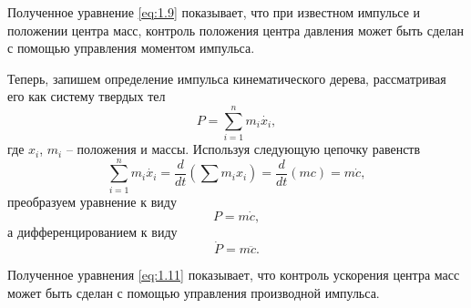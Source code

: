 Полученное уравнение \ref{eq:1.9} показывает, что при известном импульсе и положении центра масс, контроль положения центра давления может быть сделан с помощью управления моментом импульса.

Теперь, запишем определение импульса кинематического дерева, рассматривая его как систему твердых тел
\begin{equation*}
  P = \sum_{i = 1}^{n} m_{i} \dot{x_{i}},
\end{equation*}
где $x_{i}$, $m_{i}$ -- положения и массы. Используя следующую цепочку равенств
\begin{equation*}
  \sum_{i = 1}^{n} m_{i} \dot{x_{i}} = \frac{d}{dt} (\sum m_{i} x_{i}) = \frac{d}{dt} (mc) = m \dot{c},
\end{equation*}
преобразуем уравнение к виду
\begin{equation}
  P = m \dot{c}, \tag{1.10}\label{eq:1.10}
\end{equation}
а дифференцированием к виду
\begin{equation}
  \dot{P} = m \ddot{c}. \tag{1.11}\label{eq:1.11}
\end{equation}

Полученное уравнения \ref{eq:1.11} показывает, что контроль ускорения центра масс может быть сделан с помощью управления производной импульса.